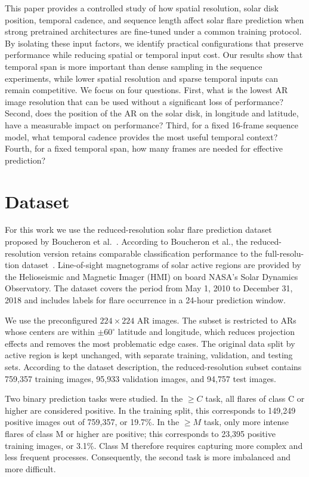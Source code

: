 \documentclass[runningheads]{llncs}
\begin{document}
This paper provides a controlled study of how spatial resolution, solar disk position, temporal cadence, and sequence length affect solar flare prediction when strong pretrained architectures are fine-tuned under a common training protocol. By isolating these input factors, we identify practical configurations that preserve performance while reducing spatial or temporal input cost. Our results show that temporal span is more important than dense sampling in the sequence experiments, while lower spatial resolution and sparse temporal inputs can remain competitive. We focus on four questions. First, what is the lowest AR image resolution that can be used without a significant loss of performance? Second, does the position of the AR on the solar disk, in longitude and latitude, have a measurable impact on performance? Third, for a fixed 16-frame sequence model, what temporal cadence provides the most useful temporal context? Fourth, for a fixed temporal span, how many frames are needed for effective prediction?

\section{Dataset}

For this work we use the reduced-resolution solar flare prediction dataset proposed by Boucheron et al.~\cite{ref_boucheron}. According to Boucheron et al., the reduced-resolution version retains comparable classification performance to the full-resolu-tion dataset~\cite{ref_boucheron}. Line-of-sight magnetograms of solar active regions are provided by the Helioseismic and Magnetic Imager (HMI) on board NASA's Solar Dynamics Observatory. The dataset covers the period from May 1, 2010 to December 31, 2018 and includes labels for flare occurrence in a 24-hour prediction window.

We use the preconfigured $224 \times 224$ AR images. The subset is restricted to ARs whose centers are within $\pm 60^\circ$ latitude and longitude, which reduces projection effects and removes the most problematic edge cases. The original data split by active region is kept unchanged, with separate training, validation, and testing sets. According to the dataset description, the reduced-resolution subset contains 759{,}357 training images, 95{,}933 validation images, and 94{,}757 test images.

Two binary prediction tasks were studied. In the $\geq C$ task, all flares of class C or higher are considered positive. In the training split, this corresponds to 149{,}249 positive images out of 759{,}357, or 19.7\%. In the $\geq M$ task, only more intense flares of class M or higher are positive; this corresponds to 23{,}395 positive training images, or 3.1\%. Class M therefore requires capturing more complex and less frequent processes. Consequently, the second task is more imbalanced and more difficult.
\end{document}
